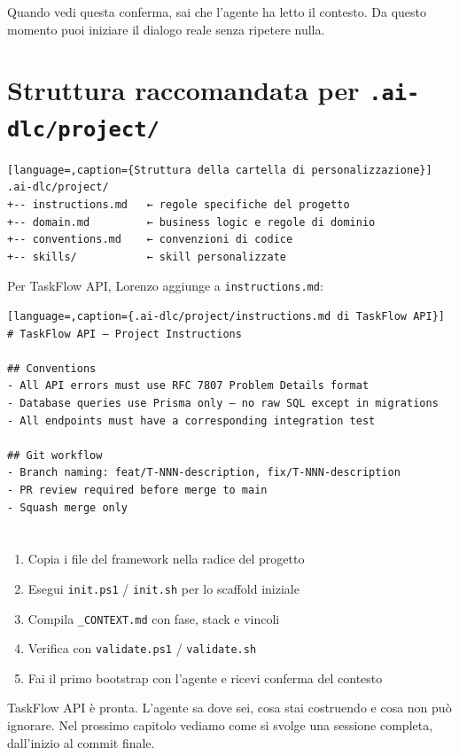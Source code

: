 Quando vedi questa conferma, sai che l'agente ha letto il contesto. Da questo momento puoi iniziare il dialogo reale senza ripetere nulla.

\section{Struttura raccomandata per \texttt{.ai-dlc/project/}}
\label{sec:02-project-dir}

\begin{lstlisting}[language=,caption={Struttura della cartella di personalizzazione}]
.ai-dlc/project/
+-- instructions.md   ← regole specifiche del progetto
+-- domain.md         ← business logic e regole di dominio
+-- conventions.md    ← convenzioni di codice
+-- skills/           ← skill personalizzate
\end{lstlisting}

Per TaskFlow API, Lorenzo aggiunge a \texttt{instructions.md}:

\begin{lstlisting}[language=,caption={.ai-dlc/project/instructions.md di TaskFlow API}]
# TaskFlow API — Project Instructions

## Conventions
- All API errors must use RFC 7807 Problem Details format
- Database queries use Prisma only — no raw SQL except in migrations
- All endpoints must have a corresponding integration test

## Git workflow
- Branch naming: feat/T-NNN-description, fix/T-NNN-description
- PR review required before merge to main
- Squash merge only
\end{lstlisting}

\section*{\LabelSummary}

\begin{enumerate}
  \item Copia i file del framework nella radice del progetto
  \item Esegui \texttt{init.ps1} / \texttt{init.sh} per lo scaffold iniziale
  \item Compila \texttt{\_CONTEXT.md} con fase, stack e vincoli
  \item Verifica con \texttt{validate.ps1} / \texttt{validate.sh}
  \item Fai il primo bootstrap con l'agente e ricevi conferma del contesto
\end{enumerate}

TaskFlow API è pronta. L'agente sa dove sei, cosa stai costruendo e cosa non può ignorare. Nel prossimo capitolo vediamo come si svolge una sessione completa, dall'inizio al commit finale.
